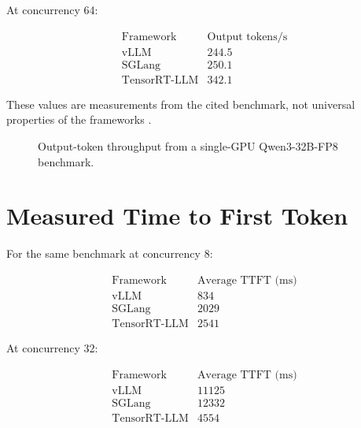 \documentclass[11pt,a4paper]{article}
\begin{document}
At concurrency 64:

\[
\begin{array}{l|r}
\text{Framework} & \text{Output tokens/s}\\
\hline
\text{vLLM} & 244.5\\
\text{SGLang} & 250.1\\
\text{TensorRT-LLM} & 342.1
\end{array}
\]

These values are measurements from the cited benchmark, not universal
properties of the frameworks \cite{benchmark2026}.

\begin{figure}[H]
\centering


\caption{Output-token throughput from a single-GPU Qwen3-32B-FP8
benchmark.}
\end{figure}

\section{Measured Time to First Token}

For the same benchmark at concurrency 8:

\[
\begin{array}{l|r}
\text{Framework} & \text{Average TTFT (ms)}\\
\hline
\text{vLLM} & 834\\
\text{SGLang} & 2029\\
\text{TensorRT-LLM} & 2541
\end{array}
\]

At concurrency 32:

\[
\begin{array}{l|r}
\text{Framework} & \text{Average TTFT (ms)}\\
\hline
\text{vLLM} & 11125\\
\text{SGLang} & 12332\\
\text{TensorRT-LLM} & 4554
\end{array}
\]
\end{document}
